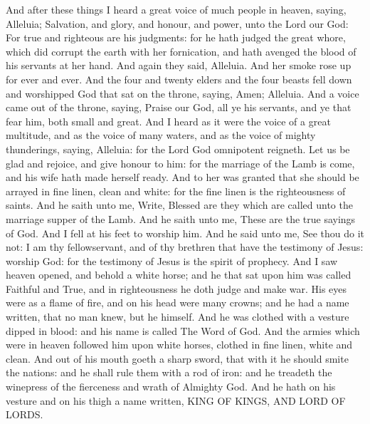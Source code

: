  And after these things I heard a great voice of much people
in heaven, saying, Alleluia; Salvation, and glory, and honour, and
power, unto the Lord our God:  For true and righteous are
his judgments: for he hath judged the great whore, which did corrupt the
earth with her fornication, and hath avenged the blood of his servants
at her hand.  And again they said, Alleluia. And her smoke
rose up for ever and ever.  And the four and twenty elders
and the four beasts fell down and worshipped God that sat on the throne,
saying, Amen; Alleluia.  And a voice came out of the throne,
saying, Praise our God, all ye his servants, and ye that fear him, both
small and great.  And I heard as it were the voice of a
great multitude, and as the voice of many waters, and as the voice of
mighty thunderings, saying, Alleluia: for the Lord God omnipotent
reigneth.  Let us be glad and rejoice, and give honour to
him: for the marriage of the Lamb is come, and his wife hath made
herself ready.  And to her was granted that she should be
arrayed in fine linen, clean and white: for the fine linen is the
righteousness of saints.  And he saith unto me, Write,
Blessed are they which are called unto the marriage supper of the Lamb.
And he saith unto me, These are the true sayings of God. 
And I fell at his feet to worship him. And he said unto me, See thou do
it not: I am thy fellowservant, and of thy brethren that have the
testimony of Jesus: worship God: for the testimony of Jesus is the
spirit of prophecy.  And I saw heaven opened, and behold a
white horse; and he that sat upon him was called Faithful and True, and
in righteousness he doth judge and make war.  His eyes were
as a flame of fire, and on his head were many crowns; and he had a name
written, that no man knew, but he himself.  And he was
clothed with a vesture dipped in blood: and his name is called The Word
of God.  And the armies which were in heaven followed him
upon white horses, clothed in fine linen, white and clean. 
And out of his mouth goeth a sharp sword, that with it he should smite
the nations: and he shall rule them with a rod of iron: and he treadeth
the winepress of the fierceness and wrath of Almighty God. 
And he hath on his vesture and on his thigh a name written, KING OF
KINGS, AND LORD OF LORDS.

